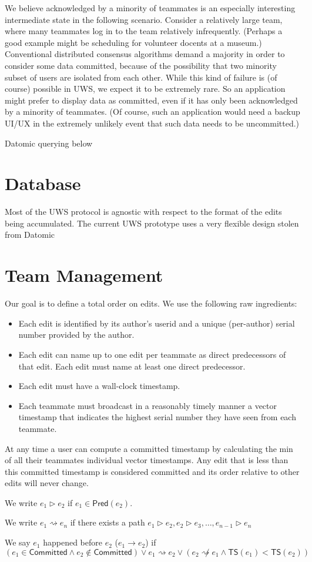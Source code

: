 \documentclass{article}
\begin{document}
We believe acknowledged by a minority of teammates is an especially interesting intermediate state in the following scenario.
Consider a relatively large team, where many teammates log in to the team relatively infrequently.
(Perhaps a good example might be scheduling for volunteer docents at a museum.)
Conventional distributed consensus algorithms demand a majority in order to consider some data committed, because of the possibility that two minority subset of users are isolated from each other.
While this kind of failure is (of course) possible in UWS, we expect it to be extremely rare.
So an application might prefer to display data as committed, even if it has only been acknowledged by a minority of teammates.
(Of course, such an application would need a backup UI/UX in the extremely unlikely event that such data needs to be uncommitted.)

Datomic querying below

\section{Database}

Most of the UWS protocol is agnostic with respect to the format of the edits being accumulated.
The current UWS prototype uses a very flexible design stolen from Datomic

\section{Team Management}

Our goal is to define a total order on edits.
We use the following raw ingredients:

\begin{itemize}
\item Each edit is identified by its author's userid and a unique (per-author) serial number provided by the author.
\item Each edit can name up to one edit per teammate as direct predecessors of that edit.
  Each edit must name at least one direct predecessor.
\item Each edit must have a wall-clock timestamp.
\item Each teammate must broadcast in a reasonably timely manner a vector timestamp that indicates the highest serial number they have seen from each teammate.
\end{itemize}

At any time a user can compute a committed timestamp by calculating the min of all their teammates individual vector timestamps.
Any edit that is less than this committed timestamp is considered committed and its order relative to other edits will never change.

We write $e_1{\rhd}e_2$ if $e_1 \in \mathsf{Pred}(e_2)$.

We write $e_1{\rightsquigarrow}e_n$ if there exists a path $e_1{\rhd}e_2, e_2{\rhd}e_3, \ldots, e_{n-1}{\rhd}e_n$

We say $e_1$ happened before $e_2$ ($e_1{\rightarrow}e_2$) if $(e_1 \in \mathsf{Committed} \land e_2 \not\in \mathsf{Committed}) \lor e_1{\rightsquigarrow}e_2 \lor (e_2{\not\rightsquigarrow}e_1 \land \mathsf{TS}(e_1)<\mathsf{TS}(e_2))$
\end{document}
